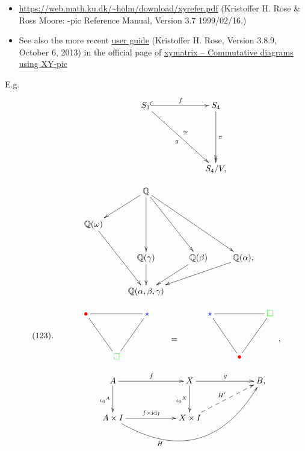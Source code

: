 \documentclass[a4paper,12pt]{article}
\newtheorem{Fundamental Theorem}{Fundamental Theorem}
\def \id {\mathrm{id}}
\newcommand{\Q}{\mathbb{Q}}
\renewcommand{\a}{{\alpha}}
\renewcommand{\b}{{\beta}}
\def \g {\gamma}
\def \w {\omega}
\def \red{\textcolor{red}}
\def \green{\textcolor{green}}
\def \blue{\textcolor{blue}}
\begin{document}
\begin{itemize}
\begin{itemize}
\item \url{https://web.math.ku.dk/~holm/download/xyrefer.pdf} (Kristoffer H. Rose \&
Ross Moore: \Xy-pic Reference Manual, Version 3.7 1999/02/16.)

\item See also the more recent \href{https://anorien.csc.warwick.ac.uk/mirrors/CTAN/macros/generic/diagrams/xypic/doc/xyguide.pdf}{user guide} (Kristoffer H. Rose,
Version 3.8.9, October 6, 2013) in the official page of \href{https://ctan.org/pkg/xymatrix?lang=en}{xymatrix – Commutative diagrams using XY-pic
}
\end{itemize}


E.g.$$\xymatrix@R=60pt@C=60pt{&S_3 \ar@{^{(}->}[r]^f \ar[dr]_{g}^{\cong} &S_4 \ar@{->>}[d]^\pi \\
&&S_4/V,
}
$$

\[
\xymatrix{ && \Q\\ 
& \Q(\w) \ar@{<-}[ur] \\ & & \Q(\g)\ar@{<-}[uu] & \Q(\b)\ar@{<-}[uul] & \Q(\a),\ar@{<-}[uull]\\
&&\Q(\a,\b,\g)\ar@{<-}[uul]\ar@{<-}[u] \ar@{<-}[ur] \ar@{<-}[urr]
} 
\] 

$$\xymatrix@R=1pt{\\\\\\(123).}\xymatrix@R=39pt{ & \red{\bullet}\ar@{-}[dr]  \ar@{-}[rr] && \blue{\star}\ar@{-}[dl] \\
                && \green{\square} }\qquad\xymatrix@R=1pt{\\\\\\\\ =}
\xymatrix@R=39pt{ & \blue{\star}\ar@{-}[dr]  \ar@{-}[rr] && \green{\square}\ar@{-}[dl] \\
                && \red{\bullet} }  \xymatrix@R=1pt{\\\\\\\\ ,}$$

$$\xymatrix@R=30pt@C=60pt
{&A\ar[d]_{{\iota_0}^A}  \ar[r]^f & X\ar[d]_{{\iota_0}^X} \ar[r]^g & B,\\
            & A \times I  \ar@/_4pc/[rru]_<<<<<<<<<<<{H} \ar[r]^{f \times \id_I} & X\times I \ar@{-->}[ur]^{H'} } $$



\end{itemize}
\end{document}
